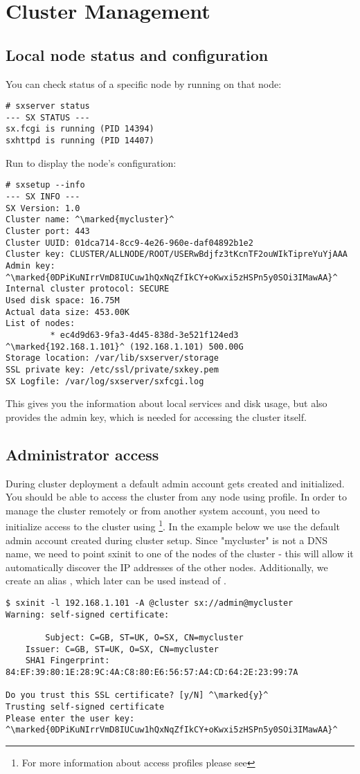 \chapter{Cluster Management}

\section{Local node status and configuration}
You can check status of a specific node by running  on
that node:
\begin{lstlisting}
# sxserver status
--- SX STATUS ---
sx.fcgi is running (PID 14394)
sxhttpd is running (PID 14407)
\end{lstlisting}
Run  to display the node's configuration:
\begin{lstlisting}
# sxsetup --info
--- SX INFO ---
SX Version: 1.0
Cluster name: ^\marked{mycluster}^
Cluster port: 443
Cluster UUID: 01dca714-8cc9-4e26-960e-daf04892b1e2
Cluster key: CLUSTER/ALLNODE/ROOT/USERwBdjfz3tKcnTF2ouWIkTipreYuYjAAA
Admin key: ^\marked{0DPiKuNIrrVmD8IUCuw1hQxNqZfIkCY+oKwxi5zHSPn5y0SOi3IMawAA}^
Internal cluster protocol: SECURE
Used disk space: 16.75M
Actual data size: 453.00K
List of nodes:
         * ec4d9d63-9fa3-4d45-838d-3e521f124ed3 ^\marked{192.168.1.101}^ (192.168.1.101) 500.00G
Storage location: /var/lib/sxserver/storage
SSL private key: /etc/ssl/private/sxkey.pem
SX Logfile: /var/log/sxserver/sxfcgi.log
\end{lstlisting}
This gives you the information about local services and disk usage, but
also provides the admin key, which is needed for accessing the cluster
itself.

\section{Administrator access}
During cluster deployment a default admin account gets created
and initialized. You should be able to access the cluster from
any node using  profile. In order
to manage the cluster remotely or from another system account,
you need to initialize access to the cluster using 
\footnote{For more information about access profiles please see
}. 
In the example below we use the default admin account created
during cluster setup. Since "mycluster" is not a DNS name, we need
to point sxinit to one of the nodes of the cluster - this will
allow it automatically discover the IP addresses of the other nodes.
Additionally, we create an alias , which later
can be used instead of .
\begin{lstlisting}
$ sxinit -l 192.168.1.101 -A @cluster sx://admin@mycluster
Warning: self-signed certificate:

        Subject: C=GB, ST=UK, O=SX, CN=mycluster
	Issuer: C=GB, ST=UK, O=SX, CN=mycluster
	SHA1 Fingerprint: 84:EF:39:80:1E:28:9C:4A:C8:80:E6:56:57:A4:CD:64:2E:23:99:7A

Do you trust this SSL certificate? [y/N] ^\marked{y}^
Trusting self-signed certificate
Please enter the user key: ^\marked{0DPiKuNIrrVmD8IUCuw1hQxNqZfIkCY+oKwxi5zHSPn5y0SOi3IMawAA}^
\end{lstlisting}

